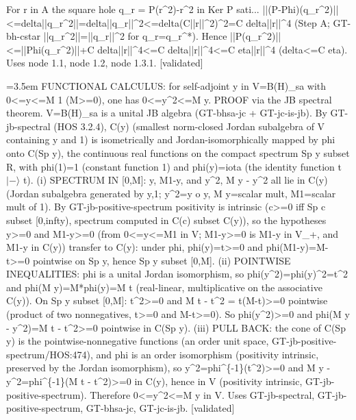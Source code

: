 \documentclass{article}
\newcommand{\step}[1]{\par\noindent\hangindent=3.5em\hangafter=1%
  \makebox[3.5em][l]{\textbf{#1.}}}
\newcommand{\steptag}[1]{\hfill{\small\textsf{[#1]}}}
\begin{document}
\begin{proofbox}{For r in A the square hole q\_r = P(r\textasciicircum{}2)-r\textasciicircum{}2 in Ker P sati...}
||(P-Phi)(q\_r\textasciicircum{}2)||<=delta||q\_r\textasciicircum{}2||=delta||q\_r||\textasciicircum{}2<=delta(C||r||\textasciicircum{}2)\textasciicircum{}2=C delta||r||\textasciicircum{}4 (Step A; GT-bh-cstar ||q\_r\textasciicircum{}2||=||q\_r||\textasciicircum{}2 for q\_r=q\_r\textasciicircum{}*). Hence ||P(q\_r\textasciicircum{}2)||<=||Phi(q\_r\textasciicircum{}2)||+C delta||r||\textasciicircum{}4<=C delta||r||\textasciicircum{}4<=C eta||r||\textasciicircum{}4 (delta<=C eta). Uses node 1.1, node 1.2, node 1.3.1. \steptag{validated} \\[6pt]
\step{1.3.1} FUNCTIONAL CALCULUS: for self-adjoint y in V=B(H)\_sa with 0<=y<=M 1 (M>=0), one has 0<=y\textasciicircum{}2<=M y. PROOF via the JB spectral theorem. V=B(H)\_sa is a unital JB algebra (GT-bhsa-jc + GT-jc-is-jb). By GT-jb-spectral (HOS 3.2.4), C(y) (smallest norm-closed Jordan subalgebra of V containing y and 1) is isometrically and Jordan-isomorphically mapped by phi onto C(Sp y), the continuous real functions on the compact spectrum Sp y subset R, with phi(1)=1 (constant function 1) and phi(y)=iota (the identity function t $|-\rangle$ t). (i) SPECTRUM IN [0,M]: y, M1-y, and y\textasciicircum{}2, M y - y\textasciicircum{}2 all lie in C(y) (Jordan subalgebra generated by y,1; y\textasciicircum{}2=y o y, M y=scalar mult, M1=scalar mult of 1). By GT-jb-positive-spectrum positivity is intrinsic (c>=0 iff Sp c subset [0,infty), spectrum computed in C(c) subset C(y)), so the hypotheses y>=0 and M1-y>=0 (from 0<=y<=M1 in V; M1-y>=0 is M1-y in V\_+, and M1-y in C(y)) transfer to C(y): under phi, phi(y)=t>=0 and phi(M1-y)=M-t>=0 pointwise on Sp y, hence Sp y subset [0,M]. (ii) POINTWISE INEQUALITIES: phi is a unital Jordan isomorphism, so phi(y\textasciicircum{}2)=phi(y)\textasciicircum{}2=t\textasciicircum{}2 and phi(M y)=M*phi(y)=M t (real-linear, multiplicative on the associative C(y)). On Sp y subset [0,M]: t\textasciicircum{}2>=0 and M t - t\textasciicircum{}2 = t(M-t)>=0 pointwise (product of two nonnegatives, t>=0 and M-t>=0). So phi(y\textasciicircum{}2)>=0 and phi(M y - y\textasciicircum{}2)=M t - t\textasciicircum{}2>=0 pointwise in C(Sp y). (iii) PULL BACK: the cone of C(Sp y) is the pointwise-nonnegative functions (an order unit space, GT-jb-positive-spectrum/HOS:474), and phi is an order isomorphism (positivity intrinsic, preserved by the Jordan isomorphism), so y\textasciicircum{}2=phi\textasciicircum{}\{-1\}(t\textasciicircum{}2)>=0 and M y - y\textasciicircum{}2=phi\textasciicircum{}\{-1\}(M t - t\textasciicircum{}2)>=0 in C(y), hence in V (positivity intrinsic, GT-jb-positive-spectrum). Therefore 0<=y\textasciicircum{}2<=M y in V. Uses GT-jb-spectral, GT-jb-positive-spectrum, GT-bhsa-jc, GT-jc-is-jb. \steptag{validated} \\[4pt]

\end{proofbox}
\end{document}
